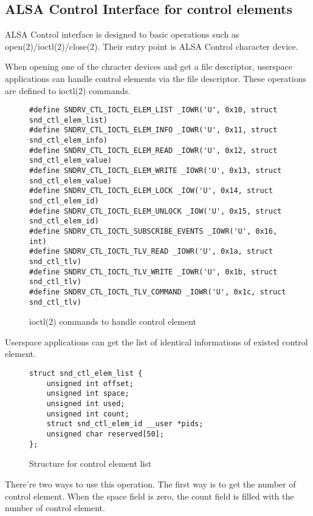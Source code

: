 \documentclass[onecolumn]{article}
\begin{document}
\subsection{ALSA Control Interface for control elements}

ALSA Control interface is designed to basic operations such as open(2)/ioctl(2)/close(2). Their entry point is ALSA Control character device.

When opening one of the chracter devices and get a file descriptor, userspace applications can handle control elements via the file descriptor. These operations are defined to ioctl(2) commands.

\begin{figure}[htbp]
\small
\begin{verbatim}
#define SNDRV_CTL_IOCTL_ELEM_LIST _IOWR('U', 0x10, struct snd_ctl_elem_list)
#define SNDRV_CTL_IOCTL_ELEM_INFO _IOWR('U', 0x11, struct snd_ctl_elem_info)
#define SNDRV_CTL_IOCTL_ELEM_READ _IOWR('U', 0x12, struct snd_ctl_elem_value)
#define SNDRV_CTL_IOCTL_ELEM_WRITE _IOWR('U', 0x13, struct snd_ctl_elem_value)
#define SNDRV_CTL_IOCTL_ELEM_LOCK _IOW('U', 0x14, struct snd_ctl_elem_id)
#define SNDRV_CTL_IOCTL_ELEM_UNLOCK _IOW('U', 0x15, struct snd_ctl_elem_id)
#define SNDRV_CTL_IOCTL_SUBSCRIBE_EVENTS _IOWR('U', 0x16, int)
#define SNDRV_CTL_IOCTL_TLV_READ _IOWR('U', 0x1a, struct snd_ctl_tlv)
#define SNDRV_CTL_IOCTL_TLV_WRITE _IOWR('U', 0x1b, struct snd_ctl_tlv)
#define SNDRV_CTL_IOCTL_TLV_COMMAND _IOWR('U', 0x1c, struct snd_ctl_tlv)
\end{verbatim}
\caption{{ioctl(2) commands to handle control element}}
\label{ioctl-handle-element}
\end{figure}

Userspace applications can get the list of identical informations of existed control element.

\begin{figure}[htbp]
\small
\begin{verbatim}
struct snd_ctl_elem_list {
	unsigned int offset;
	unsigned int space;
	unsigned int used;
	unsigned int count;
	struct snd_ctl_elem_id __user *pids;
	unsigned char reserved[50];
};
\end{verbatim}
\caption{{Structure for control element list}}
\label{snd-ctl-elem-list}
\end{figure}

There're two ways to use this operation. The first way is to get the number of control element. When the space field is zero, the count field is filled with the number of control element.
\end{document}
